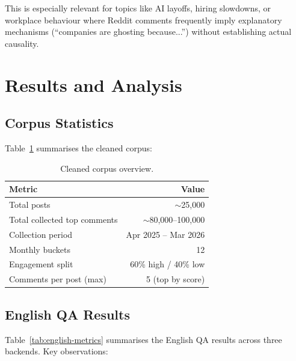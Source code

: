 \documentclass[11pt,a4paper]{article}
\begin{document}
This is especially relevant for topics like AI layoffs, hiring slowdowns, or workplace behaviour where Reddit comments frequently imply explanatory mechanisms (``companies are ghosting because...'') without establishing actual causality.


\section{Results and Analysis}
\label{sec:results}

\subsection{Corpus Statistics}

Table~\ref{tab:corpus-overview} summarises the cleaned corpus:

\begin{table}[H]
\centering
\caption{Cleaned corpus overview.}
\label{tab:corpus-overview}
\begin{tabular}{lr}
\toprule
Metric & Value \\
\midrule
Total posts & $\sim$25,000 \\
Total collected top comments & $\sim$80,000--100,000 \\
Collection period & Apr 2025 -- Mar 2026 \\
Monthly buckets & 12 \\
Engagement split & 60\% high / 40\% low \\
Comments per post (max) & 5 (top by score) \\
\bottomrule
\end{tabular}
\end{table}

\subsection{English QA Results}

Table~\ref{tab:english-metrics} summarises the English QA results across three backends. Key observations:
\end{document}
